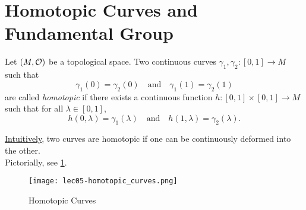 \section{Homotopic Curves and Fundamental Group}

\begin{definition}\label{def:homotopic_curves}
	Let \((M, \mathcal{O})\) be a topological space. Two continuous curves \(\gamma_1, \gamma_2: [0, 1] \to M\) such that
	\begin{equation*}
		\gamma_1(0) = \gamma_2(0) \quad \text{and} \quad \gamma_1(1) = \gamma_2(1)
	\end{equation*}
	are called \emph{homotopic} if there exists a continuous function \(h: [0, 1] \times [0, 1] \to M\) such that for all \(\lambda \in [0, 1]\),
	\begin{equation}
		h(0, \lambda) = \gamma_1(\lambda) \quad \text{and} \quad h(1, \lambda) = \gamma_2(\lambda). \label{eq:homotopic_curves}
	\end{equation}
\end{definition}
\uline{Intuitively}, two curves are homotopic if one can be continuously deformed into the other.\\
Pictorially, see \cref{fig:homotopic_curves}.
\begin{figure}[H]
	\centering
	\texttt{[image: lec05-homotopic\_curves.png]}
	\caption{Homotopic Curves}
	\label{fig:homotopic_curves}
\end{figure}

